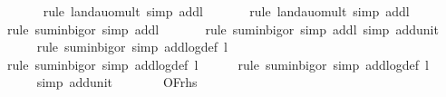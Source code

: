 \begin{isabellebody}
\ \ \ \ \ \isamarkupfalse%
\ {\isacharparenleft}{\kern0pt}rule\ landau{\isacharunderscore}{\kern0pt}o{\isachardot}{\kern0pt}mult{\isacharcomma}{\kern0pt}\ simp\ add{\isacharcolon}{\kern0pt}l{}{\isacharparenright}{\kern0pt}\isanewline
\ \ \ \ \ \isamarkupfalse%
\ {\isacharparenleft}{\kern0pt}rule\ landau{\isacharunderscore}{\kern0pt}o{\isachardot}{\kern0pt}mult{\isacharcomma}{\kern0pt}\ simp\ add{\isacharcolon}{\kern0pt}l{}{\isacharparenright}{\kern0pt}\isanewline
\ \ \ \ \ \isamarkupfalse%
\ {\isacharparenleft}{\kern0pt}rule\ sum{\isacharunderscore}{\kern0pt}in{\isacharunderscore}{\kern0pt}bigo{\isacharunderscore}{\kern0pt}r{\isacharcomma}{\kern0pt}\ simp\ add{\isacharcolon}{\kern0pt}l{}{\isacharparenright}{\kern0pt}\isanewline
\ \ \ \ \ \isamarkupfalse%
\ {\isacharparenleft}{\kern0pt}rule\ sum{\isacharunderscore}{\kern0pt}in{\isacharunderscore}{\kern0pt}bigo{\isacharunderscore}{\kern0pt}r{\isacharcomma}{\kern0pt}\ simp\ add{\isacharcolon}{\kern0pt}l{}{\isacharcomma}{\kern0pt}\ simp\ add{\isacharcolon}{\kern0pt}unit{\isacharunderscore}{\kern0pt}{}{\isacharparenright}{\kern0pt}\isanewline
\ \ \ \ \isamarkupfalse%
\ {\isacharparenleft}{\kern0pt}rule\ sum{\isacharunderscore}{\kern0pt}in{\isacharunderscore}{\kern0pt}bigo{\isacharunderscore}{\kern0pt}r{\isacharcomma}{\kern0pt}\ simp\ add{\isacharcolon}{\kern0pt}log{\isacharunderscore}{\kern0pt}def\ l{}{\isacharparenright}{\kern0pt}\isanewline
\ \ \ \ \isamarkupfalse%
\ {\isacharparenleft}{\kern0pt}rule\ sum{\isacharunderscore}{\kern0pt}in{\isacharunderscore}{\kern0pt}bigo{\isacharunderscore}{\kern0pt}r{\isacharcomma}{\kern0pt}\ simp\ add{\isacharcolon}{\kern0pt}log{\isacharunderscore}{\kern0pt}def\ l{}{\isacharparenright}{\kern0pt}\isanewline
\ \ \ \ \isamarkupfalse%
\ {\isacharparenleft}{\kern0pt}rule\ sum{\isacharunderscore}{\kern0pt}in{\isacharunderscore}{\kern0pt}bigo{\isacharunderscore}{\kern0pt}r{\isacharcomma}{\kern0pt}\ simp\ add{\isacharcolon}{\kern0pt}log{\isacharunderscore}{\kern0pt}def\ l{}{\isacharparenright}{\kern0pt}\isanewline
\ \ \ \ \isamarkupfalse%
\ {\isacharparenleft}{\kern0pt}simp\ add{\isacharcolon}{\kern0pt}unit{\isacharunderscore}{\kern0pt}{}{\isacharparenright}{\kern0pt}\isanewline
\ \ \isamarkupfalse%
\ \isamarkupfalse%
\ {\isachardoublequoteopen}{\isachardot}{\kern0pt}{\isachardot}{\kern0pt}{\isachardot}{\kern0pt}\ {\isacharequal}{\kern0pt}\ O{\isacharbrackleft}{\kern0pt}{\isacharquery}{\kern0pt}F{\isacharbrackright}{\kern0pt}{\isacharparenleft}{\kern0pt}{\isacharquery}{\kern0pt}rhs{\isacharparenright}{\kern0pt}{\isachardoublequoteclose}\isanewline

\end{isabellebody}
